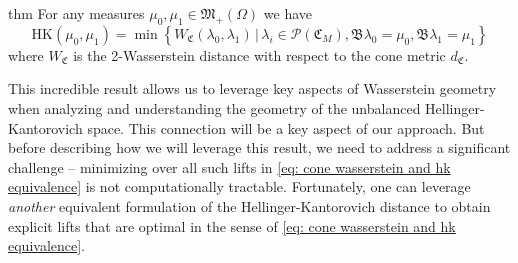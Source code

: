 \documentclass[11pt]{article}
\newcommand{\man}{M}
\begin{document}
\begin{restatable}{thm}{} 
    For any measures $\mu_0, \mu_1 \in \mathfrak{M}_+(\Omega)$ we have 
    \begin{equation} \label{eq: cone wasserstein and hk equivalence}
    \text{HK}(\mu_0, \mu_1) = \min\left\{W_{\mathfrak{C}}(\lambda_0, \lambda_1) \,\Big|\, \lambda_i \in \mathcal{P}(\mathfrak{C}_\man),  \mathfrak{B}\lambda_0 = \mu_0, \mathfrak{B}\lambda_1 = \mu_1\right\}
\end{equation}
where $W_\mathfrak{C}$ is the 2-Wasserstein distance with respect to the cone metric $d_\mathfrak{C}.$
\end{restatable}
This incredible result allows us to leverage key aspects of Wasserstein geometry when analyzing and understanding the geometry of the unbalanced Hellinger-Kantorovich space. This connection will be a key aspect of our approach. But before describing how we will leverage this result, we need to address a significant challenge -- minimizing over all such lifts in \cref{eq: cone wasserstein and hk equivalence} is not computationally tractable. Fortunately, one can leverage \textit{another} equivalent formulation of the Hellinger-Kantorovich distance to obtain explicit lifts that are optimal in the sense of \cref{eq: cone wasserstein and hk equivalence}.
\\
\end{document}
